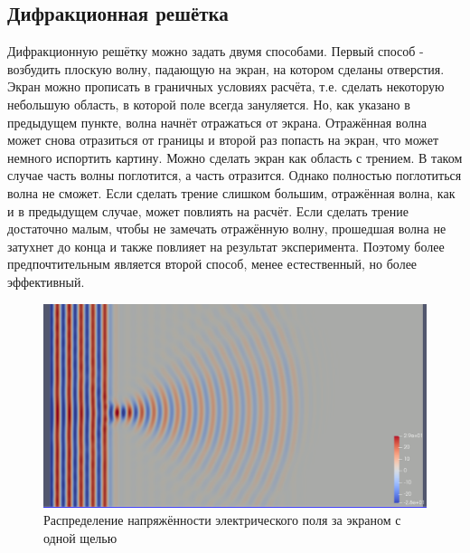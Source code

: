 \documentclass[
11pt,%
tightenlines,%
twoside,%
onecolumn,%
nofloats,%
nobibnotes,%
nofootinbib,%
superscriptaddress,%
noshowpacs,%
centertags]%
{revtex4}
\begin{document}
\subsection{Дифракционная решётка}
Дифракционную решётку можно задать двумя способами. Первый способ - возбудить плоскую волну, падающую
на экран, на котором сделаны отверстия. Экран можно прописать в граничных условиях расчёта, т.е. 
сделать некоторую небольшую область, в которой поле всегда зануляется. Но, как указано в предыдущем 
пункте, волна начнёт отражаться от экрана. Отражённая волна может снова отразиться от границы и второй
раз попасть на экран, что может немного испортить картину. Можно сделать экран как область с трением. 
В таком случае часть волны поглотится, а часть отразится. Однако полностью поглотиться волна не сможет.
Если сделать трение слишком большим, отражённая волна, как и в предыдущем случае, может повлиять на 
расчёт. Если сделать трение достаточно малым, чтобы не замечать отражённую волну, прошедшая волна 
не затухнет до конца и также повлияет на результат эксперимента. Поэтому более предпочтительным 
является второй способ, менее естественный, но более эффективный. \newline
\begin{figure}[h]
    \centering
    \includegraphics[width=13cm]{Field_with_one_gap.png}
    \caption{Распределение напряжённости электрического поля за экраном с одной щелью}
    \label{fig:1}
\end{figure}
\end{document}
